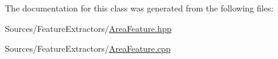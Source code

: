 The documentation for this class was generated from the following files\+:\begin{DoxyCompactItemize}
\item 
Sources/\+Feature\+Extractors/\hyperlink{_area_feature_8hpp}{Area\+Feature.\+hpp}\item 
Sources/\+Feature\+Extractors/\hyperlink{_area_feature_8cpp}{Area\+Feature.\+cpp}\end{DoxyCompactItemize}

